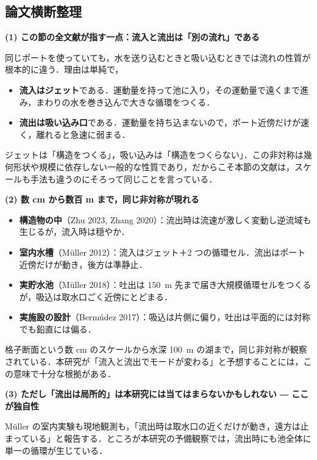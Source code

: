 \documentclass[11pt]{jsarticle}
\begin{document}
\subsection*{論文横断整理}

\noindent\textbf{(1) この節の全文献が指す一点：流入と流出は「別の流れ」である}

同じポートを使っていても，水を送り込むときと吸い込むときでは流れの性質が根本的に違う．理由は単純で，

\begin{itemize}
  \item \textbf{流入はジェット}である．運動量を持って池に入り，その運動量で遠くまで進み，まわりの水を巻き込んで大きな循環をつくる．
  \item \textbf{流出は吸い込み口}である．運動量を持ち込まないので，ポート近傍だけが速く，離れると急速に弱まる．
\end{itemize}

\noindent ジェットは「構造をつくる」，吸い込みは「構造をつくらない」．この非対称は幾何形状や規模に依存しない一般的な性質であり，だからこそ本節の文献は，スケールも手法も違うのにそろって同じことを言っている．

\medskip
\noindent\textbf{(2) 数 cm から数百 m まで，同じ非対称が現れる}

\begin{itemize}
  \item \textbf{構造物の中}（Zhu 2023, Zhang 2020）：流出時は流速が激しく変動し逆流域も生じるが，流入時は穏やか．
  \item \textbf{室内水槽}（M\"uller 2012）：流入はジェット＋2 つの循環セル．流出はポート近傍だけが動き，後方は準静止．
  \item \textbf{実貯水池}（M\"uller 2018）：吐出は 150~m 先まで届き大規模循環セルをつくるが，吸込は取水口ごく近傍にとどまる．
  \item \textbf{実施設の設計}（Berm\'udez 2017）：吸込は片側に偏り，吐出は平面的には対称でも鉛直には偏る．
\end{itemize}

\noindent 格子断面という数 cm のスケールから水深 100~m の湖まで，同じ非対称が観察されている．本研究が「流入と流出でモードが変わる」と予想することには，この意味で十分な根拠がある．

\medskip
\noindent\textbf{(3) ただし「流出は局所的」は本研究には当てはまらないかもしれない ― ここが独自性}

M\"uller の室内実験も現地観測も，「流出時は取水口の近くだけが動き，遠方は止まっている」と報告する．ところが本研究の予備観察では，流出時にも池全体に単一の循環が生じている．
\end{document}
